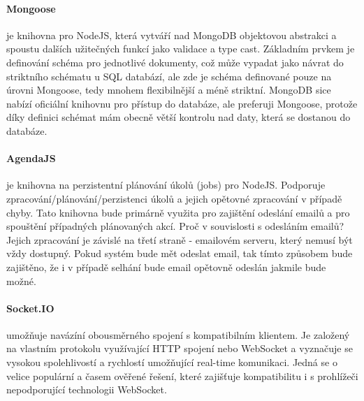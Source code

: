 \paragraph{Mongoose} je knihovna pro NodeJS, která vytváří nad MongoDB objektovou abstrakci a spoustu dalších užitečných funkcí jako validace a type cast. Základním prvkem je definování schéma pro jednotlivé dokumenty, což může vypadat jako návrat do striktního schématu u SQL databází, ale zde je schéma definované pouze na úrovni Mongoose, tedy mnohem flexibilnější a méně striktní. MongoDB sice nabízí oficiální knihovnu pro přístup do databáze, ale preferuji Mongoose, protože díky definici schémat mám obecně větší kontrolu nad daty, která se dostanou do databáze.

\paragraph{AgendaJS} je knihovna na perzistentní plánování úkolů (jobs) pro NodeJS. Podporuje zpracování/plánování/perzistenci úkolů a jejich opětovné zpracování v případě chyby. Tato knihovna bude primárně využita pro zajištění odeslání emailů a pro spouštění případných plánovaných akcí. Proč v souvislosti s odesláním emailů? Jejich zpracování je závislé na třetí straně - emailovém serveru, který nemusí být vždy dostupný. Pokud systém bude mět odeslat email, tak tímto způsobem bude zajištěno, že i v případě selhání bude email opětovně odeslán jakmile bude možné.

\paragraph{Socket.IO} umožňuje navázíní obousměrného spojení s kompatibilním klientem. Je založený na vlastním protokolu využívající HTTP spojení nebo WebSocket a vyznačuje se vysokou spolehlivostí a rychlostí umožňující real-time komunikaci. Jedná se o velice populární a časem ověřené řešení, které zajišťuje kompatibilitu i s prohlížeči nepodporující technologii WebSocket.



